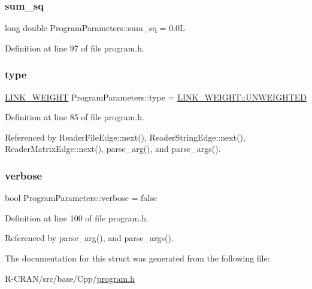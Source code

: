 \subsubsection{\texorpdfstring{sum\+\_\+sq}{sum\_sq}}
{\footnotesize\ttfamily long double Program\+Parameters\+::sum\+\_\+sq = 0.\+0L}



Definition at line 97 of file program.\+h.

\mbox{\label{structProgramParameters_a16744d2514e8a8f026f5833aac619ae3}} 
\subsubsection{\texorpdfstring{type}{type}}
{\footnotesize\ttfamily \hyperlink{program_8h_ae6ceb3d65141eae67f722c4c39a3a2df}{L\+I\+N\+K\+\_\+\+W\+E\+I\+G\+HT} Program\+Parameters\+::type = \hyperlink{program_8h_ae6ceb3d65141eae67f722c4c39a3a2dfa52d154e24f499de7f8d658277a292f97}{L\+I\+N\+K\+\_\+\+W\+E\+I\+G\+H\+T\+::\+U\+N\+W\+E\+I\+G\+H\+T\+ED}}



Definition at line 85 of file program.\+h.



Referenced by Reader\+File\+Edge\+::next(), Reader\+String\+Edge\+::next(), Reader\+Matrix\+Edge\+::next(), parse\+\_\+arg(), and parse\+\_\+args().

\mbox{\label{structProgramParameters_a1fbe41b908139a22638722a607ebd354}} 
\subsubsection{\texorpdfstring{verbose}{verbose}}
{\footnotesize\ttfamily bool Program\+Parameters\+::verbose = false}



Definition at line 100 of file program.\+h.



Referenced by parse\+\_\+arg(), and parse\+\_\+args().



The documentation for this struct was generated from the following file\+:\begin{DoxyCompactItemize}
\item 
R-\/\+C\+R\+A\+N/src/base/\+Cpp/\hyperlink{program_8h}{program.\+h}\end{DoxyCompactItemize}
